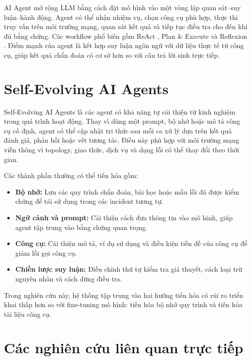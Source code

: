 AI Agent mở rộng LLM bằng cách đặt mô hình vào một vòng lặp quan sát--suy luận--hành động. Agent có thể nhận nhiệm vụ, chọn công cụ phù hợp, thực thi truy vấn trên môi trường mạng, quan sát kết quả và tiếp tục điều tra cho đến khi đủ bằng chứng. Các workflow phổ biến gồm ReAct \cite{react2023}, Plan \& Execute \cite{planexecute2023} và Reflexion \cite{reflexion2023}. Điểm mạnh của agent là kết hợp suy luận ngôn ngữ với dữ liệu thực tế từ công cụ, giúp kết quả chẩn đoán có cơ sở hơn so với câu trả lời sinh trực tiếp.

\section{Self-Evolving AI Agents}
\label{sec:self-evolving-agents}

Self-Evolving AI Agents là các agent có khả năng tự cải thiện từ kinh nghiệm trong quá trình hoạt động. Thay vì dùng một prompt, bộ nhớ hoặc mô tả công cụ cố định, agent có thể cập nhật tri thức sau mỗi ca xử lý dựa trên kết quả đánh giá, phản hồi hoặc vết tương tác. Điều này phù hợp với môi trường mạng viễn thông vì topology, giao thức, dịch vụ và dạng lỗi có thể thay đổi theo thời gian.

Các thành phần thường có thể tiến hóa gồm:
\begin{itemize}
    \item \textbf{Bộ nhớ:} Lưu các quy trình chẩn đoán, bài học hoặc mẫu lỗi đã được kiểm chứng để tái sử dụng trong các incident tương tự.
    \item \textbf{Ngữ cảnh và prompt:} Cải thiện cách đưa thông tin vào mô hình, giúp agent tập trung vào bằng chứng quan trọng.
    \item \textbf{Công cụ:} Cải thiện mô tả, ví dụ sử dụng và điều kiện tiền đề của công cụ để giảm lỗi gọi công cụ.
    \item \textbf{Chiến lược suy luận:} Điều chỉnh thứ tự kiểm tra giả thuyết, cách loại trừ nguyên nhân và cách dừng điều tra.
\end{itemize}

Trong nghiên cứu này, hệ thống tập trung vào hai hướng tiến hóa có rủi ro triển khai thấp hơn so với fine-tuning mô hình: tiến hóa bộ nhớ quy trình và tiến hóa tài liệu công cụ.

\section{Các nghiên cứu liên quan trực tiếp}
\label{sec:related_frameworks}

